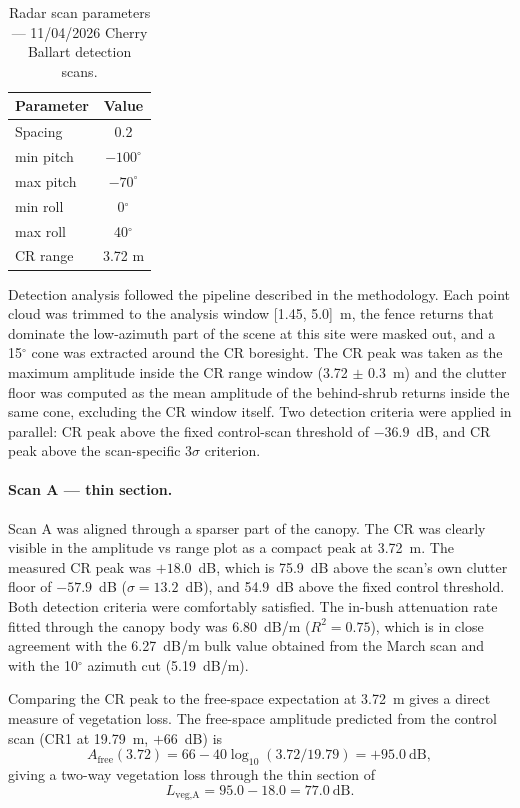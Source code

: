 \begin{table}[H]
\centering
\caption{Radar scan parameters --- 11/04/2026 Cherry Ballart detection scans.}
\label{tab:shrub_11apr_params}
\begin{tabular}{lc}
\hline
\textbf{Parameter} & \textbf{Value} \\
\hline
Spacing     & 0.2 \\
min pitch   & $-100^{\circ}$ \\
max pitch   & $-70^{\circ}$  \\
min roll    & 0$^{\circ}$   \\
max roll    & 40$^{\circ}$  \\
CR range    & 3.72 m \\
\hline
\end{tabular}
\end{table}

Detection analysis followed the pipeline described in the methodology. Each point cloud was trimmed to the analysis window [1.45, 5.0]~m, the fence returns that dominate the low-azimuth part of the scene at this site were masked out, and a 15$^\circ$ cone was extracted around the CR boresight. The CR peak was taken as the maximum amplitude inside the CR range window (3.72 $\pm$ 0.3~m) and the clutter floor was computed as the mean amplitude of the behind-shrub returns inside the same cone, excluding the CR window itself. Two detection criteria were applied in parallel: CR peak above the fixed control-scan threshold of $-36.9$~dB, and CR peak above the scan-specific 3$\sigma$ criterion.

\paragraph{Scan A --- thin section.}
Scan A was aligned through a sparser part of the canopy. The CR was clearly visible in the amplitude vs range plot as a compact peak at 3.72~m. The measured CR peak was $+18.0$~dB, which is 75.9~dB above the scan's own clutter floor of $-57.9$~dB ($\sigma = 13.2$~dB), and 54.9~dB above the fixed control threshold. Both detection criteria were comfortably satisfied. The in-bush attenuation rate fitted through the canopy body was 6.80~dB/m ($R^2 = 0.75$), which is in close agreement with the 6.27~dB/m bulk value obtained from the March scan and with the 10$^\circ$ azimuth cut (5.19~dB/m).

Comparing the CR peak to the free-space expectation at 3.72~m gives a direct measure of vegetation loss. The free-space amplitude predicted from the control scan (CR1 at 19.79~m, $+66$~dB) is
\begin{equation}
    A_{\text{free}}(3.72) = 66 - 40\log_{10}(3.72/19.79) = +95.0~\text{dB},
\end{equation}
giving a two-way vegetation loss through the thin section of
\begin{equation}
    L_{\text{veg,A}} = 95.0 - 18.0 = 77.0~\text{dB}.
\end{equation}

